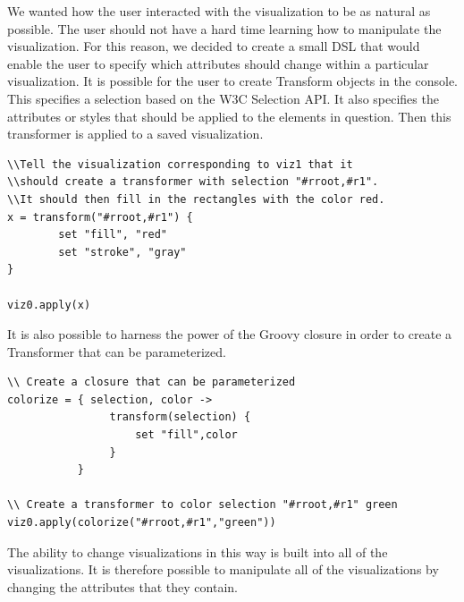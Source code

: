 We wanted how the user interacted with the visualization to be as natural as possible. The user should not have a hard time learning how to manipulate the visualization. For this reason, we decided to create a small DSL that would enable the user to specify which attributes should change within a particular visualization. It is possible for the user to create Transform objects in the console. This specifies a selection based on the W3C Selection API. It also specifies the attributes or styles that should be applied to the elements in question. Then this transformer is applied to a saved visualization.

\begin{verbatim}
\\Tell the visualization corresponding to viz1 that it 
\\should create a transformer with selection "#rroot,#r1". 
\\It should then fill in the rectangles with the color red. 
x = transform("#rroot,#r1") {
        set "fill", "red"
        set "stroke", "gray"
}

viz0.apply(x)
\end{verbatim}

It is also possible to harness the power of the Groovy closure in order to create a Transformer that can be parameterized.

\begin{verbatim}
\\ Create a closure that can be parameterized
colorize = { selection, color ->
                transform(selection) {
                    set "fill",color
                }    
           }

\\ Create a transformer to color selection "#rroot,#r1" green
viz0.apply(colorize("#rroot,#r1","green"))
\end{verbatim}

The ability to change visualizations in this way is built into all of the visualizations. It is therefore possible to manipulate all of the visualizations by changing the attributes that they contain.